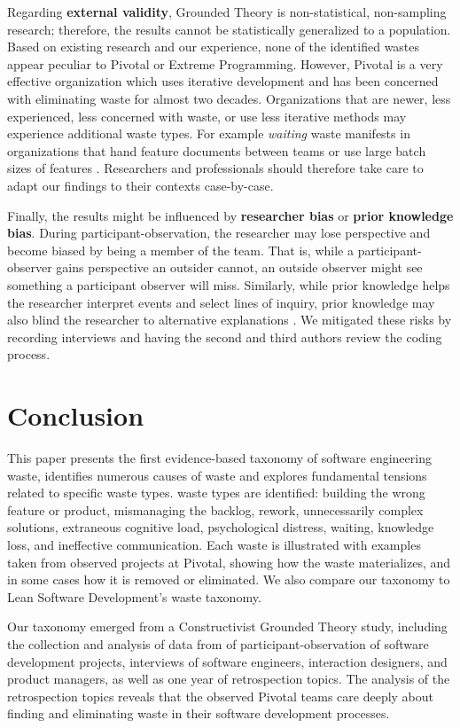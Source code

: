 Regarding \textbf{external validity}, Grounded Theory is non-statistical, non-sampling research; therefore, the results cannot be statistically generalized to a population. Based on existing research and our experience, none of the identified wastes appear peculiar to Pivotal or Extreme Programming. However, Pivotal is a very effective organization which uses iterative development and has been concerned with eliminating waste for almost two decades. Organizations that are newer, less experienced, less concerned with waste, or use less iterative methods may experience additional waste types. For example \textit{waiting} waste manifests in organizations that hand feature documents between teams or use large batch sizes of features \cite{Ali2016, Khurum2014, Mujtaba2010}. Researchers and professionals should therefore take care to adapt our findings to their contexts case-by-case. 

Finally, the results might be influenced by \textbf{researcher bias} or \textbf{prior knowledge bias}. During participant-observation, the researcher may lose perspective and become biased by being a member of the team. That is, while a participant-observer gains perspective an outsider cannot, an outside observer might see something a participant observer will miss. Similarly, while prior knowledge helps the researcher interpret events and select lines of inquiry, prior knowledge may also blind the researcher to alternative explanations \cite{GlaserIssues}. We mitigated these risks by recording interviews and having the second and third authors review the coding process.
\section{Conclusion}
\label{Conclusion}
This paper presents the first evidence-based taxonomy of software engineering waste, identifies numerous causes of waste and explores fundamental tensions related to specific waste types. \numberOfWastes{} waste types are identified: building the wrong feature or product, mismanaging the backlog, rework, unnecessarily complex solutions, extraneous cognitive load, 
psychological distress, waiting, knowledge loss, and ineffective communication. Each waste is illustrated with examples taken from observed projects at Pivotal, showing how the waste materializes, and in some cases how it is removed or eliminated. We also compare our taxonomy to Lean Software Development's waste taxonomy.

Our taxonomy emerged from a Constructivist Grounded Theory study, including the collection and analysis of data from \durationOfResearchStudyPlural{} of participant-observation of  \numberOfObservedProjects{} software development projects, interviews of \numberOfInterviews{} software engineers, interaction designers, and product managers, as well as one year of retrospection topics. The analysis of the retrospection topics reveals that the observed Pivotal teams care deeply about finding and eliminating waste in their software development processes. 

